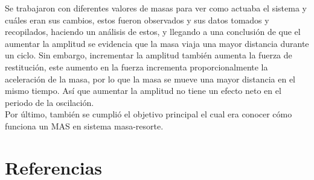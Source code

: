 \documentclass[spanish,notitlepage,letterpaper, 12pt]{article}
\begin{document}
Se trabajaron con diferentes valores de masas para ver como actuaba
el sistema y cuáles eran sus cambios, estos fueron observados y sus datos tomados y recopilados, haciendo un análisis de estos, y llegando a una conclusión de que el aumentar la amplitud se evidencia que la masa viaja una mayor distancia durante un ciclo. Sin embargo, incrementar la amplitud también
aumenta la fuerza de restitución, este aumento en la fuerza incrementa proporcionalmente la aceleración de la masa, por lo que la masa se mueve una mayor distancia en el mismo tiempo. Así que aumentar la amplitud no tiene un efecto neto en el periodo de la oscilación.\\

Por último, también se cumplió el objetivo principal el cual era conocer cómo funciona un MAS en sistema masa-resorte.
\section{Referencias} 


\end{document}

